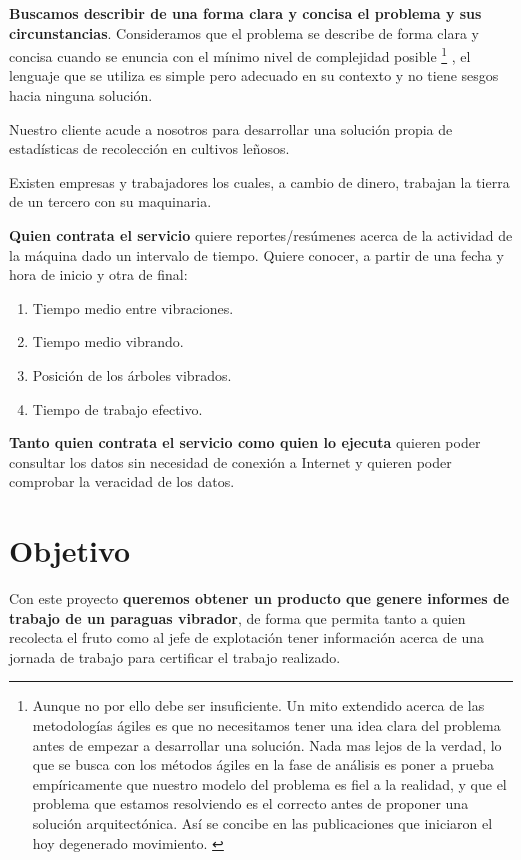 \textbf{Buscamos describir de una forma clara y concisa el problema y sus
circunstancias}. Consideramos que el problema se describe de forma clara y
concisa cuando se enuncia con el mínimo nivel de complejidad posible%
%
\footnote{Aunque
no por ello debe ser insuficiente. Un mito extendido acerca de las metodologías ágiles
es que no necesitamos tener una idea clara del problema antes de empezar a desarrollar
una solución. Nada mas lejos de la verdad, lo que se busca con los métodos ágiles en la
fase de análisis es poner a prueba empíricamente que nuestro modelo del problema es fiel
a la realidad, y que el problema que estamos resolviendo es el correcto antes de proponer
una solución arquitectónica. Así se concibe en las publicaciones que iniciaron el hoy
degenerado movimiento. \cite{AgileBackToBasics}
}%
, el lenguaje que se utiliza es simple pero adecuado
en su contexto y no tiene sesgos hacia ninguna solución.

Nuestro cliente acude a nosotros para desarrollar una solución propia de
estadísticas de recolección en cultivos leñosos.

Existen empresas y trabajadores los cuales, a cambio de dinero, trabajan la
tierra de un tercero con su maquinaria.

\textbf{Quien contrata el servicio} quiere reportes/resúmenes acerca de la actividad
de la máquina dado un intervalo de tiempo. Quiere conocer, a partir de una fecha y hora de inicio y otra de final:

\begin{enumerate}
   \item Tiempo medio entre vibraciones.
   \item Tiempo medio vibrando.
   \item Posición de los árboles vibrados.
   \item Tiempo de trabajo efectivo.
\end{enumerate}

\textbf{Tanto quien contrata el servicio como quien lo ejecuta} quieren poder consultar
los datos sin necesidad de conexión a Internet y quieren poder comprobar la veracidad de los datos.

\section{Objetivo}

Con este proyecto \textbf{queremos obtener un producto que genere informes
de trabajo de un paraguas vibrador}, de forma que permita tanto a
quien recolecta el fruto como al jefe de explotación tener información
acerca de una jornada de trabajo para certificar el trabajo realizado.

